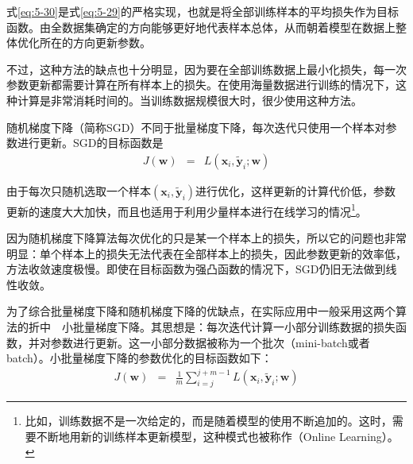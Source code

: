 \parinterval 式\ref{eq:5-30}是式\ref{eq:5-29}的严格实现，也就是将全部训练样本的平均损失作为目标函数。由全数据集确定的方向能够更好地代表样本总体，从而朝着模型在数据上整体优化所在的方向更新参数。

\parinterval 不过，这种方法的缺点也十分明显，因为要在全部训练数据上最小化损失，每一次参数更新都需要计算在所有样本上的损失。在使用海量数据进行训练的情况下，这种计算是非常消耗时间的。当训练数据规模很大时，很少使用这种方法。

%

\vspace{0.5em}
\vspace{0.5em}

\parinterval 随机梯度下降（简称SGD）不同于批量梯度下降，每次迭代只使用一个样本对参数进行更新。SGD的目标函数是
\begin{eqnarray}
J(\mathbf w)&=&L(\mathbf x_i,\mathbf {\widetilde y}_i;\mathbf w)
\label{eq:5-31}
\end{eqnarray}

\noindent 由于每次只随机选取一个样本$(\mathbf x_i,\mathbf {\widetilde y}_i)$进行优化，这样更新的计算代价低，参数更新的速度大大加快，而且也适用于利用少量样本进行在线学习的情况\footnote{比如，训练数据不是一次给定的，而是随着模型的使用不断追加的。这时，需要不断地用新的训练样本更新模型，这种模式也被称作{\scriptsize{}}（Online Learning）。}。

\parinterval 因为随机梯度下降算法每次优化的只是某一个样本上的损失，所以它的问题也非常明显：单个样本上的损失无法代表在全部样本上的损失，因此参数更新的效率低，方法收敛速度极慢。即使在目标函数为强凸函数的情况下，SGD仍旧无法做到线性收敛。

%

\vspace{0.5em}
\vspace{0.5em}

\parinterval 为了综合批量梯度下降和随机梯度下降的优缺点，在实际应用中一般采用这两个算法的折中\ \dash \ 小批量梯度下降。其思想是：每次迭代计算一小部分训练数据的损失函数，并对参数进行更新。这一小部分数据被称为一个批次（mini-batch或者batch）。小批量梯度下降的参数优化的目标函数如下：
\begin{eqnarray}
J(\mathbf w)&=&\frac{1}{m}\sum_{i=j}^{j+m-1}{L(\mathbf x_i,\mathbf {\widetilde y}_i;\mathbf w)}
\label{eq:5-32}
\end{eqnarray}

